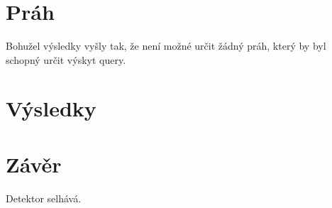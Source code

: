 \documentclass[10pt, a4paper]{article}
\begin{document}
\begin{flushleft}
\medskip

\begin{figure}[H]
	\\
	\\
	\\
\end{figure}

\section{Práh}
Bohužel výsledky vyšly tak, že není možné určit žádný práh, který by byl schopný určit výskyt query.

\section{Výsledky}

\section{Závěr}
Detektor selhává.

\end{flushleft}
\end{document}
